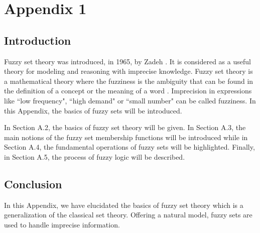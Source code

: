 \chapter{Appendix 1}
\section{Introduction}
Fuzzy set theory was introduced, in 1965, by Zadeh
\cite{fuzzysets}. It is considered as a useful theory for modeling
and reasoning with imprecise knowledge. Fuzzy set theory is a mathematical theory where the fuzziness
is the ambiguity that can be found in the definition of a
concept or the meaning of a word \cite{7f}. Imprecision in
expressions like ``low frequency", ``high demand" or ``small
number" can be called fuzziness. In this Appendix, the basics of fuzzy sets will be introduced. 

In Section A.2, the basics of fuzzy set theory will be given. In Section A.3, the main notions of the fuzzy set membership functions will be introduced while in Section A.4, the fundamental operations of fuzzy sets will be highlighted. Finally, in Section A.5, the process of fuzzy logic will be described.

\section{Conclusion}
In this Appendix, we have elucidated the basics of fuzzy set
theory which is a generalization of the classical set theory.
Offering a natural model,  fuzzy sets are used to handle imprecise information.

